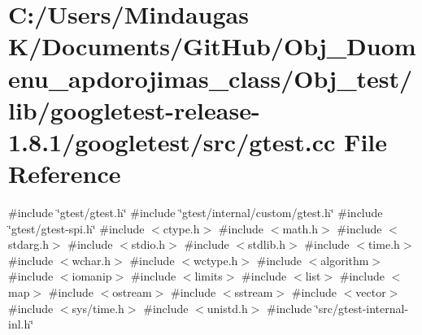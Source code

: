 \hypertarget{_obj__test_2lib_2googletest-release-1_88_81_2googletest_2src_2gtest_8cc}{}\section{C\+:/\+Users/\+Mindaugas K/\+Documents/\+Git\+Hub/\+Obj\+\_\+\+Duomenu\+\_\+apdorojimas\+\_\+class/\+Obj\+\_\+test/lib/googletest-\/release-\/1.8.1/googletest/src/gtest.cc File Reference}
\label{_obj__test_2lib_2googletest-release-1_88_81_2googletest_2src_2gtest_8cc}
{\ttfamily \#include \char`\"{}gtest/gtest.\+h\char`\"{}}\newline
{\ttfamily \#include \char`\"{}gtest/internal/custom/gtest.\+h\char`\"{}}\newline
{\ttfamily \#include \char`\"{}gtest/gtest-\/spi.\+h\char`\"{}}\newline
{\ttfamily \#include $<$ctype.\+h$>$}\newline
{\ttfamily \#include $<$math.\+h$>$}\newline
{\ttfamily \#include $<$stdarg.\+h$>$}\newline
{\ttfamily \#include $<$stdio.\+h$>$}\newline
{\ttfamily \#include $<$stdlib.\+h$>$}\newline
{\ttfamily \#include $<$time.\+h$>$}\newline
{\ttfamily \#include $<$wchar.\+h$>$}\newline
{\ttfamily \#include $<$wctype.\+h$>$}\newline
{\ttfamily \#include $<$algorithm$>$}\newline
{\ttfamily \#include $<$iomanip$>$}\newline
{\ttfamily \#include $<$limits$>$}\newline
{\ttfamily \#include $<$list$>$}\newline
{\ttfamily \#include $<$map$>$}\newline
{\ttfamily \#include $<$ostream$>$}\newline
{\ttfamily \#include $<$sstream$>$}\newline
{\ttfamily \#include $<$vector$>$}\newline
{\ttfamily \#include $<$sys/time.\+h$>$}\newline
{\ttfamily \#include $<$unistd.\+h$>$}\newline
{\ttfamily \#include \char`\"{}src/gtest-\/internal-\/inl.\+h\char`\"{}}\newline

